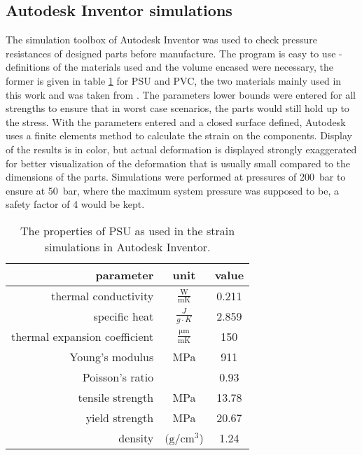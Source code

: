     \subsection{Autodesk Inventor simulations}
    The simulation toolbox of Autodesk Inventor was used to check pressure resistances of designed parts before manufacture. The program is easy to use - definitions of the materials used and the volume encased were necessary, the former is given in table \ref{table:sim:PSU} for PSU and PVC, the two materials mainly used in this work and was taken from \cite{noauthor_basf_nodate}. The parameters lower bounds were entered for all strengths to ensure that in worst case scenarios, the parts would still hold up to the stress. With the parameters entered and a closed surface defined, Autodesk uses a finite elements method to calculate the strain on the components. Display of the results is in color, but actual deformation is displayed strongly exaggerated for better visualization of the deformation that is usually small compared to the dimensions of the parts. Simulations were performed at pressures of \SI{200}{\bar} to ensure at \SI{50}{\bar}, where the maximum system pressure was supposed to be, a safety factor of 4 would be kept.
        \begin{table}
            \centering
            \begin{tabular}{|r|c|c|}
                \hline
                parameter & unit & value\\
                \hline
                thermal conductivity & $\frac{\si{\watt}}{\si{\meter} \si{\kelvin}}$ & 0.211 \\
                specific heat & $\frac{J}{g\cdot K }$ & 2.859\\
                thermal expansion coefficient & $\frac{\si{\micro\meter}}{\si{\m}\si{\kelvin}}$ & 150 \\
                Young's modulus & MPa & 911\\
                Poisson's ratio && 0.93\\
                tensile strength & MPa & 13.78\\
                yield strength & MPa & 20.67\\
                density &$(\si{\g}/\si{\cm\cubed}$) & 1.24 \\
                \hline
            \end{tabular}
            \caption[PSU properties]{The properties of PSU as used in the strain simulations in Autodesk Inventor.}
            \label{table:sim:PSU}
        \end{table}
